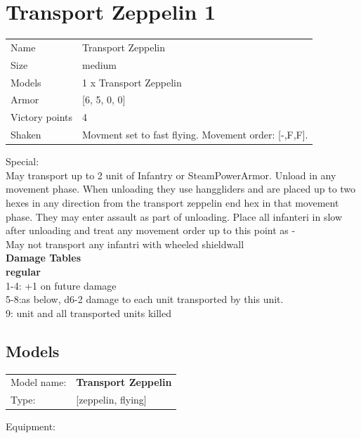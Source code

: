 \clearpage

\section{ Transport Zeppelin 1 }

\begin{tabular}{ll}
  Name & Transport Zeppelin \\
  Size & medium\\
  Models & 1 x Transport Zeppelin\\
  Armor & [6, 5, 0, 0]\\
  Victory points & 4\\
  Shaken & Movment set to fast flying. Movement order: [-,F,F].\\
\end{tabular}

Special:\\
May transport up to 2 unit of Infantry or SteamPowerArmor. Unload in any movement phase. When unloading they use hanggliders and are placed up to two hexes in any direction from the transport zeppelin end hex in that movement phase. They may enter assault as part of unloading. Place all infanteri in slow after unloading and treat any movement order up to this point as -\\ 
May not transport any infantri with wheeled shieldwall\\ 



{\bf Damage Tables} \\
 {\bf regular } \\
1-4: +1 on future damage \\
5-8:as below, d6-2 damage to each unit transported by this unit. \\
9: unit and all transported units killed \\


\clearpage

\subsection{ Models }

\begin{tabular}{ll}
Model name: & {\bf Transport Zeppelin } \\
Type: & [zeppelin, flying] \\
\end{tabular}

Equipment:  \\

